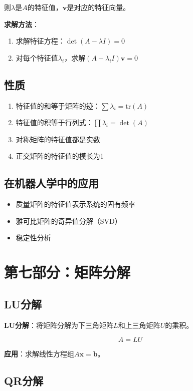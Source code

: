 \documentclass[12pt,a4paper]{article}
\begin{document}
则$\lambda$是$A$的特征值，$\bm{v}$是对应的特征向量。

\textbf{求解方法}：
\begin{enumerate}
\item 求解特征方程：$\det(A - \lambda I) = 0$
\item 对每个特征值$\lambda_i$，求解$(A - \lambda_i I)\bm{v} = 0$
\end{enumerate}

\subsection{性质}

\begin{enumerate}
\item 特征值的和等于矩阵的迹：$\sum \lambda_i = \text{tr}(A)$
\item 特征值的积等于行列式：$\prod \lambda_i = \det(A)$
\item 对称矩阵的特征值都是实数
\item 正交矩阵的特征值的模长为1
\end{enumerate}

\subsection{在机器人学中的应用}

\begin{itemize}
\item 质量矩阵的特征值表示系统的固有频率
\item 雅可比矩阵的奇异值分解（SVD）
\item 稳定性分析
\end{itemize}

\section{第七部分：矩阵分解}

\subsection{LU分解}

\textbf{LU分解}：将矩阵分解为下三角矩阵$L$和上三角矩阵$U$的乘积。

\begin{equation}
A = LU
\end{equation}

\textbf{应用}：求解线性方程组$A\bm{x} = \bm{b}$。

\subsection{QR分解}
\end{document}
